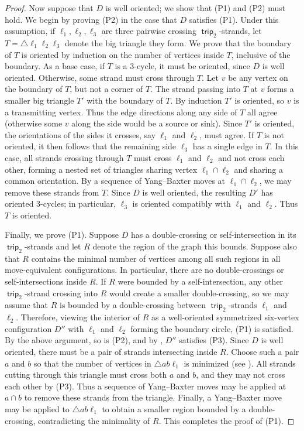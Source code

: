 \documentclass{amsart}
\theoremstyle{definition}
\theoremstyle{remark}
\numberwithin{equation}{section}
\DeclareMathOperator{\trip}{\mathsf{trip}}
\newcommand{\symm}{symmetrized }
\begin{document}
\begin{proof}
Now suppose that $D$ is well oriented; we show that (P1) and (P2) must hold. We begin by proving (P2) in the case that $D$ satisfies (P1). Under this assumption, if $\ell_1,\ell_2,\ell_3$ are three pairwise crossing $\trip_2$-strands, let $T=\triangle \ell_1\ell_2\ell_3$ denote the big triangle they form.  We prove that the boundary of $T$ is oriented by induction on the number of vertices inside $T$, inclusive of the boundary. As a base case, if $T$ is a $3$-cycle, it must be oriented, since $D$ is well oriented. Otherwise, some strand must cross through $T$. Let $v$ be any vertex on the boundary of $T$, but not a corner of $T$. The strand passing into $T$ at $v$ forms a smaller big triangle $T'$ with the boundary of $T$. By induction $T'$ is oriented, so $v$ is a transmitting vertex. Thus the edge directions along any side of $T$ all agree (otherwise some $v$ along the side would be a source or sink).  Since $T'$ is oriented, the orientations of the sides it crosses, say $\ell_1$ and $\ell_2$, must agree. If $T$ is not oriented, it then follows that the remaining side $\ell_3$ has a single edge in $T$. In this case, all strands crossing through $T$ must cross $\ell_1$ and $\ell_2$ and not cross each other, forming a nested set of triangles sharing vertex $\ell_1 \cap \ell_2$ and sharing a common orientation. By a sequence of Yang--Baxter moves at $\ell_1 \cap \ell_2$, we may remove these strands from $T$. Since $D$ is well oriented, the resulting $D'$ has oriented 3-cycles; in particular, $\ell_3$ is oriented compatibly with $\ell_1$ and $\ell_2$. Thus $T$ is oriented.
    
Finally, we prove (P1). Suppose $D$ has a double-crossing or self-intersection in its $\trip_2$-strands and let $R$ denote the region of the graph this bounds. Suppose also that $R$ contains the minimal number of vertices among all such regions in all move-equivalent configurations. In particular, there are no double-crossings or self-intersections inside $R$. If $R$ were bounded by a self-intersection, any other $\trip_2$-strand crossing into $R$ would create a smaller double-crossing, so we may assume that $R$ is bounded by a double-crossing between $\trip_2$-strands $\ell_1$ and $\ell_2$. Therefore, viewing the interior of $R$ as a well-oriented \symm six-vertex configuration $D''$ with $\ell_1$ and $\ell_2$ forming the boundary circle, (P1) is satisfied. By the above argument, so is (P2), and by , $D''$ satisfies (P3). Since $D$ is well oriented, there must be a pair of strands intersecting inside $R$. Choose such a pair $a$ and $b$ so that the number of vertices in $\triangle a b \ell_1$ is minimized (see ). All strands cutting through this triangle must cross both $a$ and $b$, and they may not cross each other by (P3). Thus a sequence of Yang--Baxter moves may be applied at $a \cap b$ to remove these strands from the triangle. Finally, a Yang--Baxter move may be applied to $\triangle ab\ell_1$ to obtain a smaller region bounded by a double-crossing, contradicting the minimality of $R$. This completes the proof of (P1).
\end{proof}
\end{document}
